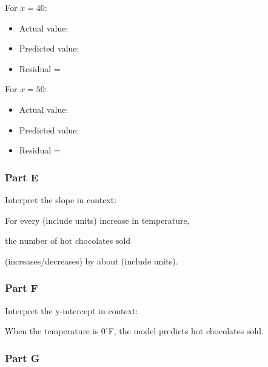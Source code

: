 \documentclass[12pt]{article}
\begin{document}
				For $x = 40$:
				\begin{itemize}
					\item Actual value: \underline{\hspace{1in}}
					\item Predicted value: \underline{\hspace{1in}}
					\item Residual = \underline{\hspace{1in}}
				\end{itemize}

				For $x = 50$:
				\begin{itemize}
					\item Actual value: \underline{\hspace{1in}}
					\item Predicted value: \underline{\hspace{1in}}
					\item Residual = \underline{\hspace{1in}}
				\end{itemize}

				\newpage

			\subsubsection*{Part E}
			
				Interpret the slope in context:

				For every \underline{\hspace{2in}} (include units) increase in temperature,

				the number of hot chocolates sold
				
				\underline{\hspace{2in}} (increases/decreases) by about \underline{\hspace{1.4in}} (include units).

			\subsubsection*{Part F}
			
				Interpret the y-intercept in context:

				When the temperature is $0^\circ$F, the model predicts \underline{\hspace{1in}} hot chocolates sold.

			\subsubsection*{Part G}
			
\end{document}
